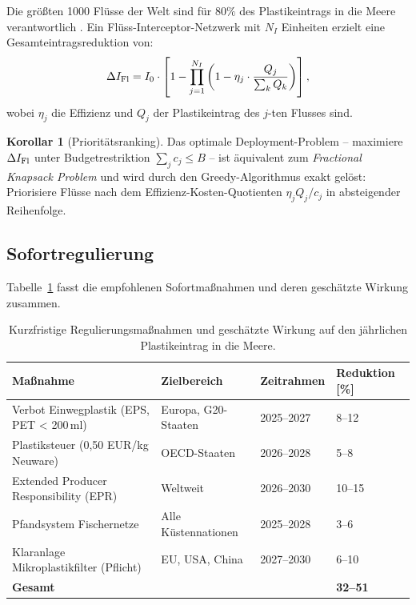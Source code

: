 ﻿\documentclass[12pt,a4paper]{article}
\theoremstyle{definition}
\newtheorem{korollar}{Korollar}[section]
\theoremstyle{remark}
\begin{document}
Die gr\"o\ss{}ten 1000 Fl\"usse der Welt sind f\"ur $80\%$ des
Plastikeintrags in die Meere verantwortlich \cite{lebreton2017evidence}.
Ein Fl\"uss-Interceptor-Netzwerk mit $N_I$ Einheiten erzielt eine
Gesamteintragsreduktion von:
\begin{equation}
  \Delta I_{\rm Fl} = I_0 \cdot \left[1 - \prod_{j=1}^{N_I}
  \left(1 - \eta_j \cdot \frac{Q_j}{\sum_k Q_k}\right)\right],
  \label{eq:interceptor}
\end{equation}
wobei $\eta_j$ die Effizienz und $Q_j$ der Plastikeintrag des
$j$-ten Flusses sind.

\begin{korollar}[Priorit\"atsranking]
Das optimale Deployment-Problem -- maximiere $\Delta I_{\rm Fl}$ unter
Budgetrestriktion $\sum_j c_j \leq B$ -- ist \"aquivalent zum
\textit{Fractional Knapsack Problem} und wird durch den Greedy-Algorithmus
exakt gel\"ost: Priorisiere Fl\"usse nach dem Effizienz-Kosten-Quotienten
$\eta_j Q_j / c_j$ in absteigender Reihenfolge.
\end{korollar}

\subsection{Sofortregulierung}

Tabelle~\ref{tab:regulierung} fasst die empfohlenen Sofortma\ss{}nahmen und
deren gesch\"atzte Wirkung zusammen.

\begin{table}[H]
\centering
\caption{Kurzfristige Regulierungsma\ss{}nahmen und gesch\"atzte Wirkung auf den
  j\"ahrlichen Plastikeintrag in die Meere.}
\label{tab:regulierung}
\begin{tabular}{p{5cm} p{4cm} p{2.5cm} p{2.5cm}}
\toprule
\textbf{Ma\ss{}nahme} & \textbf{Zielbereich} & \textbf{Zeitrahmen} & \textbf{Reduktion [\%]} \\
\midrule
Verbot Einwegplastik (EPS, PET < 200\,ml) & Europa, G20-Staaten & 2025--2027 & 8--12 \\
Plastiksteuer (0{,}50 EUR/kg Neuware) & OECD-Staaten & 2026--2028 & 5--8 \\
Extended Producer Responsibility (EPR) & Weltweit & 2026--2030 & 10--15 \\
Pfandsystem Fischernetze & Alle K\"ustennationen & 2025--2028 & 3--6 \\
Klaranlage Mikroplastikfilter (Pflicht) & EU, USA, China & 2027--2030 & 6--10 \\
\bottomrule
\textbf{Gesamt} & & & \textbf{32--51} \\
\bottomrule
\end{tabular}
\end{table}
\end{document}
